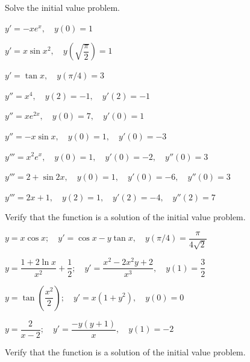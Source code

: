 \begin{exerciselist}
\item\label{exer:1.2.4}Solve the  initial value problem.

\begin{alist}
\item %
 $y'=-xe^x, \quad y(0)=1$
\item %
 $y'=x \sin x^2, \quad y\left(\sqrt{\dfrac{\pi}{2}}\right)=1$

\item %
$y'=\tan x, \quad y(\pi/4)=3$

\item %
$y''=x^4, \quad y(2)=-1, \quad y'(2)=-1$

\item %
$y''=xe^{2x}, \quad y(0)=7, \quad y'(0)=1$

\item %
$y''=- x \sin x, \quad y(0)=1, \quad y'(0)=-3$

\item %
$y'''=x^2e^x, \quad y(0)=1, \quad y'(0)=-2, \quad
y''(0)=3$

\item %
$y'''=2+\sin 2x, \quad y(0)=1, \quad y'(0)=-6, \quad
y''(0)=3$

\item %
$y'''=2x+1, \quad y(2)=1, \quad
y'(2)=-4, \quad y''(2)=7$
\end{alist}

\item\label{exer:1.2.5}Verify that the  function is a solution of
the initial value problem.

\begin{alist}
\item %
$y=x\cos x;     \quad y'=\cos x-y\tan x, \quad
y(\pi/4)=\dfrac{\pi}{4\sqrt{2}}$

\item %
$y=\dfrac{1+2\ln x}{x^2}+\dfrac{1}{2};     \quad
y'=\dfrac{x^2-2x^2y+2}{x^3},   \quad y(1)=\dfrac{3}{2}$

\item %
$y=\tan\left(\dfrac{x^2}{2}\right);
\quad y'=x(1+y^2),   \quad y(0)=0$

\item %
$y=\dfrac{2}{x-2};     \quad y'=\dfrac{-y(y+1)}{x}, \quad
y(1)=-2$
\end{alist}

\item\label{exer:1.2.6}Verify that the  function is a solution of
the initial value problem.


\end{exerciselist}
